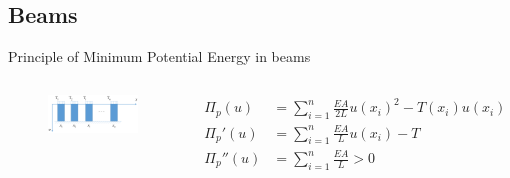 \documentclass[11pt]{beamer}
\begin{document}
\subsection{Beams}
\begin{frame}{Principle of Minimum Potential Energy in beams}
\begin{columns}
\begin{figure}
\centering
\includegraphics[width=1\linewidth]{source/many_elastc_body}
\end{figure}
\begin{block}{}
\begin{align*}
\Pi_p(u)&= \sum\limits_{i=1}^{n} \frac{EA}{2L}u(x_i)^2-T(x_i)u(x_i)\\
\Pi_p'(u)&= \sum\limits_{i=1}^{n} \frac{EA}{L}u(x_i)-T\\
\Pi_p''(u)&= \sum\limits_{i=1}^{n} \frac{EA}{L}>0
\end{align*}
\end{block}
\end{columns}
\end{frame}
\end{document}
